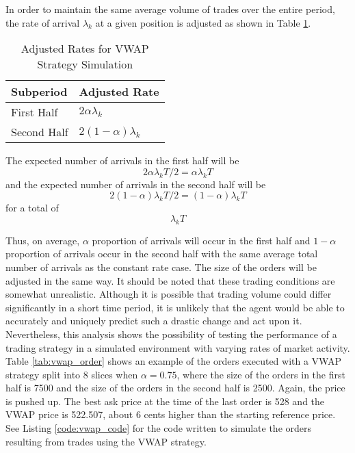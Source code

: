 In order to maintain the same average volume of trades over the entire period, the rate of arrival $\lambda_k$ at a given position is adjusted as shown in Table \ref{tab:adjusted_rates}.

\begin{table}[htbp]
\caption{Adjusted Rates for VWAP Strategy Simulation} \label{tab:adjusted_rates}
\begin{center}
\begin{tabular}{l|l}
\textbf{Subperiod}            & \textbf{Adjusted Rate}             \\
\hline
First Half  & $2 \alpha \lambda_k $    \\
Second Half & $2 (1 - \alpha) \lambda_k$
\end{tabular}
\end{center}
\end{table}

The expected number of arrivals in the first half will be 
$$2 \alpha \lambda_k T / 2 = \alpha \lambda_k T$$ 
and the expected number of arrivals in the second half will be 
$$2 (1-\alpha) \lambda_k T / 2 = (1-\alpha) \lambda_k T$$
for a total of $$\lambda_k T$$

Thus, on average, $\alpha$ proportion of arrivals will occur in the first half and $1-\alpha$ proportion of arrivals occur in the second half with the same average total number of arrivals as the constant rate case. The size of the orders will be adjusted in the same way. It should be noted that these trading conditions are somewhat unrealistic. Although it is possible that trading volume could differ significantly in a short time period, it is unlikely that the agent would be able to accurately and uniquely predict such a drastic change and act upon it. Nevertheless, this analysis shows the possibility of testing the performance of a trading strategy in a simulated environment with varying rates of market activity. Table \ref{tab:vwap_order} shows an example of the orders executed with a VWAP strategy split into 8 slices when $\alpha = 0.75$, where the size of the orders in the first half is 7500 and the size of the orders in the second half is 2500. Again, the price is pushed up. The best ask price at the time of the last order is 528 and the VWAP price is 522.507, about 6 cents higher than the starting reference price. See Listing \ref{code:vwap_code} for the code written to simulate the orders resulting from trades using the VWAP strategy.

